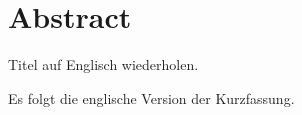 \thispagestyle{plain}

\section*{Abstract}
Titel auf Englisch wiederholen.

Es folgt die englische Version der Kurzfassung.
